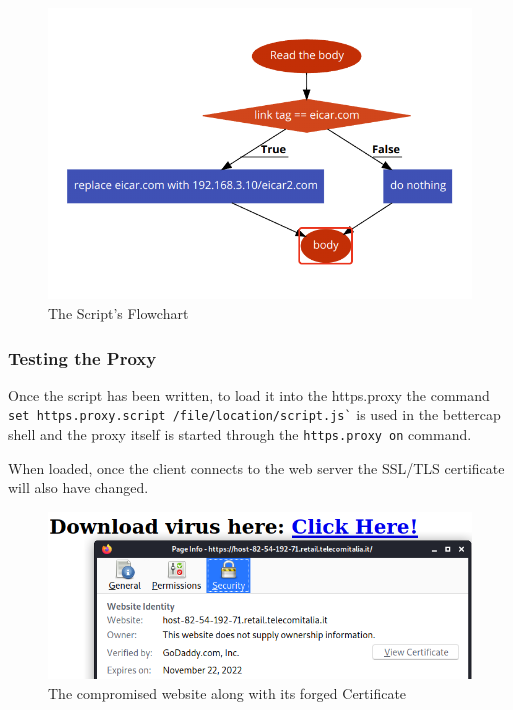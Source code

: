 \documentclass[status=normal,cover=tesi,language=en]{gmeepd}
\begin{document}
\begin{figure}[h!]
 \centering
 \includegraphics[width=13cm]{img/script_flowchart.png}
 \caption{The Script's Flowchart}
 \label{fig: flowchart}
\end{figure}

\pagebreak

\subsubsection{Testing the Proxy}

Once the script has been written, to load it into the https.proxy the command \verb|set https.proxy.script /file/location/script.js`| is used in the bettercap shell and the proxy itself is started through the \verb|https.proxy on| command.

When loaded, once the client connects to the web server the SSL/TLS certificate will also have changed.

\begin{figure}[h!]
 \centering
 \includegraphics[width=13cm]{img/spoofed_certificate.png}
 \caption{The compromised website along with its forged Certificate}
 \label{fig: spoofed-certificate}
\end{figure}
\end{document}
